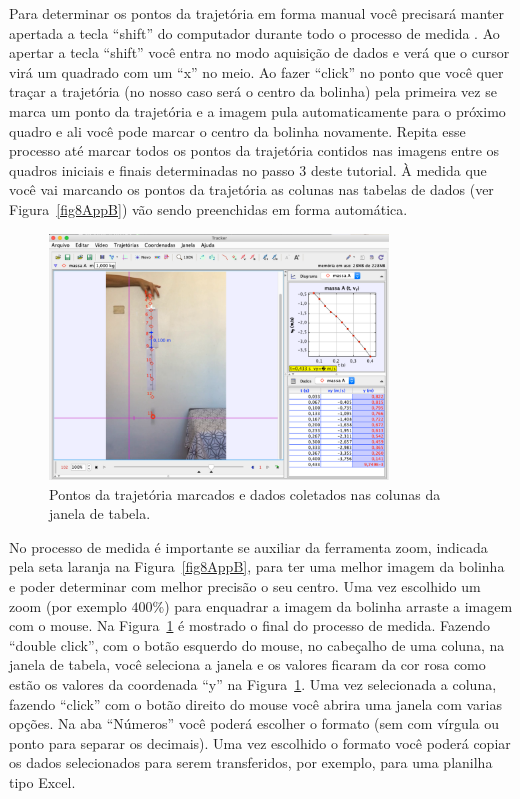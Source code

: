 Para determinar os pontos da trajetória em forma manual você precisará manter 
apertada a tecla ``shift'' do computador durante todo o processo de medida . Ao apertar a tecla ``shift'' você entra no modo aquisição de dados e verá que o cursor virá um quadrado com um ``x'' no meio.
Ao fazer ``click'' no ponto que você quer traçar a trajetória (no nosso caso será o centro da bolinha)
pela primeira vez se marca um ponto da trajetória e a imagem pula automaticamente para o próximo quadro e ali você pode marcar o centro da bolinha novamente. Repita esse processo até marcar todos os pontos da trajetória contidos nas imagens entre os quadros iniciais e finais determinadas no passo 3 deste tutorial. À medida que você vai marcando os pontos da trajetória as colunas nas tabelas de dados (ver Figura~\ref{fig8AppB}) vão sendo preenchidas em forma automática.
\begin{figure}[h!]
      \centering
\includegraphics[width=9cm]{Figuras_exp3/fig9AppB.pdf}
\caption{\label{fig9AppB} Pontos da trajetória marcados e dados coletados nas colunas da janela de tabela.}
\end{figure}
No processo de medida é importante se auxiliar da ferramenta zoom, indicada pela seta laranja na 
Figura~\ref{fig8AppB}, para ter uma melhor imagem da bolinha e poder determinar com melhor precisão o seu centro. Uma vez escolhido um zoom (por exemplo $400\%$) para enquadrar a imagem 
da bolinha arraste a imagem com o mouse. Na Figura~\ref{fig9AppB} é mostrado 
o final do processo de medida. Fazendo ``double click'', com o botão esquerdo do mouse, no cabeçalho de uma coluna, na janela de tabela, você seleciona a janela e os valores ficaram da cor rosa como estão os valores da coordenada ``y'' na Figura~\ref{fig9AppB}. Uma vez selecionada a 
coluna, fazendo ``click'' com o botão direito do mouse você abrira uma janela com varias opções.
Na aba ``Números'' você poderá escolher o formato (sem com vírgula ou ponto para separar os decimais). Uma vez escolhido o formato você poderá copiar os dados selecionados para serem transferidos, por exemplo, para uma planilha tipo Excel. 
 